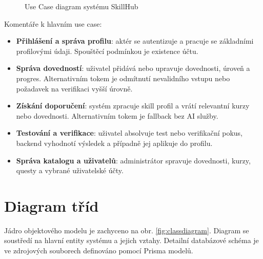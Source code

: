 \documentclass[12pt,a4paper]{report}
\begin{document}
\begin{figure}[ht]
\centering
{}
\caption{Use Case diagram systému SkillHub}
\label{fig:usecase}
\end{figure}

Komentáře k hlavním use case:
\begin{itemize}
  \item \textbf{Přihlášení a správa profilu}: aktér se autentizuje a pracuje se základními profilovými údaji. Spouštěcí podmínkou je existence účtu.
  \item \textbf{Správa dovedností}: uživatel přidává nebo upravuje dovednosti, úroveň a progres. Alternativním tokem je odmítnutí nevalidního vstupu nebo požadavek na verifikaci vyšší úrovně.
  \item \textbf{Získání doporučení}: systém zpracuje skill profil a vrátí relevantní kurzy nebo dovednosti. Alternativním tokem je fallback bez AI služby.
  \item \textbf{Testování a verifikace}: uživatel absolvuje test nebo verifikační pokus, backend vyhodnotí výsledek a případně jej aplikuje do profilu.
  \item \textbf{Správa katalogu a uživatelů}: administrátor spravuje dovednosti, kurzy, questy a vybrané uživatelské účty.
\end{itemize}

\section{Diagram tříd}
Jádro objektového modelu je zachyceno na obr. \ref{fig:classdiagram}. Diagram se soustředí na hlavní entity systému a jejich vztahy. Detailní databázové schéma je ve zdrojových souborech definováno pomocí Prisma modelů.
\end{document}

